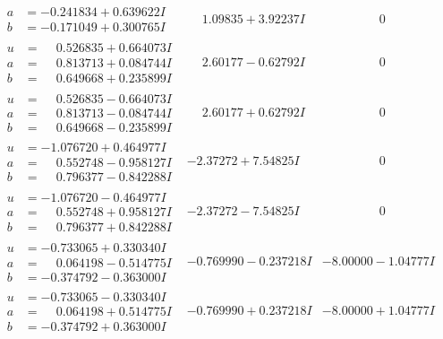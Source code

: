 \documentclass[1p]{elsarticle_modified}
\theoremstyle{definition}
\begin{document}
$$\begin{array}{c|c|c}
\begin{aligned}
a &= -0.241834 + 0.639622 I \\
b &= -0.171049 + 0.300765 I\end{aligned}
 & \phantom{-}1.09835 + 3.92237 I & \phantom{-0.000000 } 0 \\ \hline\begin{aligned}
u &= \phantom{-}0.526835 + 0.664073 I \\
a &= \phantom{-}0.813713 + 0.084744 I \\
b &= \phantom{-}0.649668 + 0.235899 I\end{aligned}
 & \phantom{-}2.60177 - 0.62792 I & \phantom{-0.000000 } 0 \\ \hline\begin{aligned}
u &= \phantom{-}0.526835 - 0.664073 I \\
a &= \phantom{-}0.813713 - 0.084744 I \\
b &= \phantom{-}0.649668 - 0.235899 I\end{aligned}
 & \phantom{-}2.60177 + 0.62792 I & \phantom{-0.000000 } 0 \\ \hline\begin{aligned}
u &= -1.076720 + 0.464977 I \\
a &= \phantom{-}0.552748 - 0.958127 I \\
b &= \phantom{-}0.796377 - 0.842288 I\end{aligned}
 & -2.37272 + 7.54825 I & \phantom{-0.000000 } 0 \\ \hline\begin{aligned}
u &= -1.076720 - 0.464977 I \\
a &= \phantom{-}0.552748 + 0.958127 I \\
b &= \phantom{-}0.796377 + 0.842288 I\end{aligned}
 & -2.37272 - 7.54825 I & \phantom{-0.000000 } 0 \\ \hline\begin{aligned}
u &= -0.733065 + 0.330340 I \\
a &= \phantom{-}0.064198 - 0.514775 I \\
b &= -0.374792 - 0.363000 I\end{aligned}
 & -0.769990 - 0.237218 I & -8.00000 - 1.04777 I \\ \hline\begin{aligned}
u &= -0.733065 - 0.330340 I \\
a &= \phantom{-}0.064198 + 0.514775 I \\
b &= -0.374792 + 0.363000 I\end{aligned}
 & -0.769990 + 0.237218 I & -8.00000 + 1.04777 I \\ \hline\begin{aligned}

\end{aligned}
\end{array}$$
\end{document}
